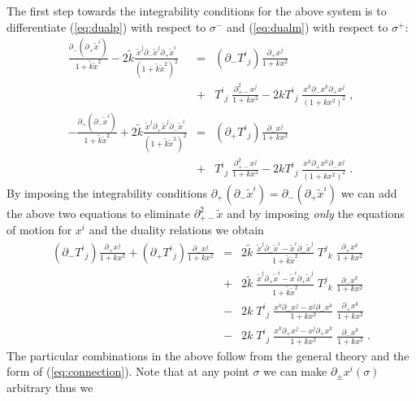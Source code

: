\documentclass[a4paper,12pt]{article}
\newcommand{\Tij}{T^{i}{}_{j}}
\newcommand{\Tjk}{T^{j}{}_{k}}
\newcommand{\dalem}{\partial^{2}_{+-}}
\newcommand{\dminus}{\partial_{-}}
\newcommand{\dplus}{\partial_{+}}
\newcommand{\ktil}{\tilde{k}}
\newcommand{\xtil}{\tilde{x}}
\begin{document}
The first step towards the integrability conditions for the above 
system is to differentiate (\ref{eq:dualp}) with respect to 
$\sigma^{-}$ and 
(\ref{eq:dualm}) with respect to $\sigma^{+}$:
\begin{eqnarray}
    \frac{\dminus(\dplus \xtil^{i})}{1 + \ktil \xtil^{2}}
    	- 2\ktil \frac{\xtil^{j}\dminus \xtil^{j} \dplus 
    	\xtil^{i}}{(1 + \ktil \xtil^{2})^{2}} & = & 
	(\dminus \Tij) \frac{\dplus x^{j}}{1 + kx^{2}} 
    \nonumber  \\
     & + & \Tij\; \frac{\dalem x^{j}}{1 + k x^{2}} -
     2 k \Tij\; \frac{x^{k}\dminus x^{k}\dplus x^{j}}{(1 + k x^{2})^{2}}\;,
    \label{eq:intp} \\
    -\frac{\dplus(\dminus \xtil^{i})}{1 + \ktil \xtil^{2}}
    	+ 2\ktil \frac{\xtil^{j}\dplus \xtil^{j} \dminus 
    	\xtil^{i}}{(1 + \ktil \xtil^{2})^{2}} & = & 
	(\dplus \Tij) \frac{\dminus x^{j}}{1 + kx^{2}} 
    \nonumber  \\
     & + & \Tij\; \frac{\dalem x^{j}}{1 + k x^{2}} -
     2 k \Tij\; \frac{x^{k}\dplus x^{k}\dminus x^{j}}{(1 + k x^{2})^{2}}\;.
    \label{eq:intm}
\end{eqnarray}
By imposing the integrability conditions $\dplus(\dminus\xtil^{i}) = 
\dminus(\dplus\xtil^{i})$ we can add the above two equations to 
eliminate $\dalem \xtil$ and by imposing {\em only} the equations of motion 
for $x^{i}$ and the duality relations we obtain
\begin{eqnarray}
    (\dminus \Tij) \frac{\dplus x^{j}}{1 + kx^{2}}
    + (\dplus \Tij) \frac{\dminus x^{j}}{1 + kx^{2}}
     & = & 2\ktil\;
     	\frac{\xtil^{j}\dminus \xtil^{i}
	- \xtil^{i}\dminus \xtil^{j}}{1 + \ktil \xtil^{2}}\;
	\Tjk\; \frac{\dplus x^{k}}{1 + k x^{2}}
      \nonumber\\
     & + & 2\ktil\;
     	\frac{\xtil^{j}\dplus \xtil^{i}
	- \xtil^{i}\dplus \xtil^{j}}{1 + \ktil \xtil^{2}}\;
	\Tjk\; \frac{\dminus x^{k}}{1 + k x^{2}}
      \nonumber\\
     & - & 2k\;
     	\Tij\; \frac{x^{k} \dminus x^{j} - x^{j} \dminus x^{k}}{1 + kx^{2}}
	\; \frac{\dplus x^{k}}{1 + k x^{2}}
	\nonumber\\
     & - & 2k\;
     	\Tij\; \frac{x^{k} \dplus x^{j} - x^{j} \dplus x^{k}}{1 + kx^{2}}
	\; \frac{\dminus x^{k}}{1 + k x^{2}}\;.
    \label{eq:integrability}
\end{eqnarray}
The particular combinations in the above follow from the general
theory and the form of (\ref{eq:connection}).  Note that at any point
$\sigma$ we can make $\partial_{\pm}x^{i}(\sigma)$ arbitrary thus we
\end{document}
